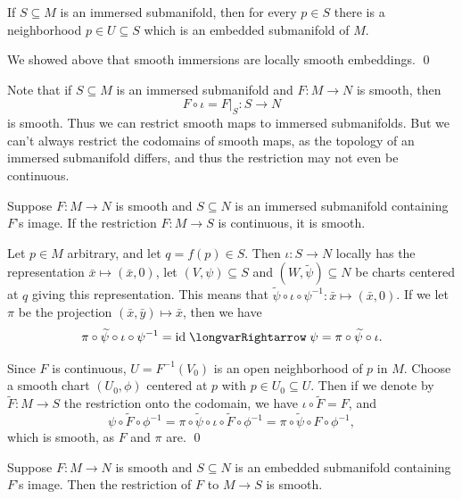 \bprop

    If $S\subseteq M$ is an immersed submanifold, then for every $p\in S$ there is a neighborhood $p\in U\subseteq S$
    which is an embedded submanifold of $M$.

\eprop

\bproof

    We showed above that smooth immersions are locally smooth embeddings.
    \qed

\eproof

Note that if $S\subseteq M$ is an immersed submanifold and $F\colon M\to N$ is smooth, then
$$ F\circ\iota = F|_S\colon S\to N $$
is smooth.
Thus we can restrict smooth maps to immersed submanifolds.
But we can't always restrict the codomains of smooth maps, as the topology of an immersed submanifold differs, and thus the restriction
may not even be continuous.

\bthrm

    Suppose $F\colon M\to N$ is smooth and $S\subseteq N$ is an immersed submanifold containing $F$'s image.
    If the restriction $F\colon M\to S$ is continuous, it is smooth.

\ethrm

\bproof

    Let $p\in M$ arbitrary, and let $q=f(p)\in S$.
    Then $\iota\colon S\to N$ locally has the representation $\bar x\mapsto(\bar x,0)$, let $(V,\psi)\subseteq S$ and $(W,\tilde\psi)\subseteq N$
    be charts centered at $q$ giving this representation.
    This means that $\tilde\psi\circ\iota\circ\psi^{-1}\colon\bar x\mapsto(\bar x,0)$.
    If we let $\pi$ be the projection $(\bar x,\bar y)\mapsto\bar x$, then we have
    $$ \pi\circ\tilde\psi\circ\iota\circ\psi^{-1} = \id \implies \psi = \pi\circ\tilde\psi\circ\iota . $$

    Since $F$ is continuous, $U=F^{-1}(V_0)$ is an open neighborhood of $p$ in $M$.
    Choose a smooth chart $(U_0,\phi)$ centered at $p$ with $p\in U_0\subseteq U$.
    Then if we denote by $\tilde F\colon M\to S$ the restriction onto the codomain, we have $\iota\circ\tilde F=F$, and
    $$ \psi\circ\tilde F\circ\phi^{-1} = \pi\circ\tilde\psi\circ\iota\circ\tilde F\circ\phi^{-1} = \pi\circ\tilde\psi\circ F\circ\phi^{-1} , $$
    which is smooth, as $F$ and $\pi$ are.
    \qed

\eproof

\bcoro

    Suppose $F\colon M\to N$ is smooth and $S\subseteq N$ is an embedded submanifold containing $F$'s image.
    Then the restriction of $F$ to $M\to S$ is smooth.

